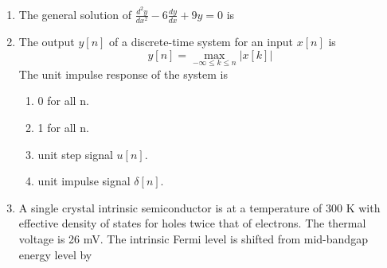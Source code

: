 \documentclass[a4paper, 11pt]{article}
\begin{document}
\begin{enumerate}
    \hfill{}
    
    \item The general solution of $\frac{d^2y}{dx^2} - 6\frac{dy}{dx} + 9y = 0$ is
    \begin{enumerate}
    \end{enumerate}

    \hfill{}

    \item The output $y[n]$ of a discrete-time system for an input $x[n]$ is
    $$y[n] = \max_{-\infty \le k \le n} |x[k]|$$
    The unit impulse response of the system is
    \begin{enumerate}
        \item 0 for all n.
        \item 1 for all n.
        \item unit step signal $u[n]$.
        \item unit impulse signal $\delta[n]$.
    \end{enumerate}

    \hfill{}

    \item A single crystal intrinsic semiconductor is at a temperature of 300 K with effective density of states for holes twice that of electrons. The thermal voltage is 26 mV. The intrinsic Fermi level is shifted from mid-bandgap energy level by
    \begin{enumerate}
    \end{enumerate}

    \hfill{}


\end{enumerate}
\end{document}
